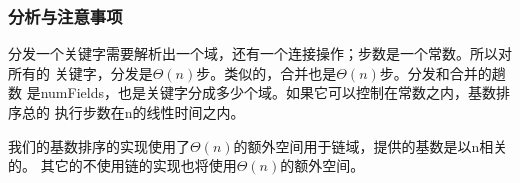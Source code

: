 \subsubsection{分析与注意事项}
分发一个关键字需要解析出一个域，还有一个连接操作；步数是一个常数。所以对所有的
关键字，分发是$\Theta(n)$步。类似的，合并也是$\Theta(n)$步。分发和合并的趟数
是numFields，也是关键字分成多少个域。如果它可以控制在常数之内，基数排序总的
执行步数在n的线性时间之内。

我们的基数排序的实现使用了$\Theta(n)$的额外空间用于链域，提供的基数是以n相关的。
其它的不使用链的实现也将使用$\Theta(n)$的额外空间。
